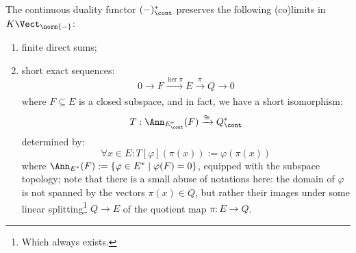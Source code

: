         \begin{proposition} \label{prop: properties_of_continuous_duals}
            The continuous duality functor $(-)^*_{\cont}$ preserves the following (co)limits in $K\-\Vect_{\norm{-}}$:
            \begin{enumerate}
                \item finite direct sums;
                \item short exact sequences:
                    $$0 \to F \xrightarrow[]{\ker \pi} E \xrightarrow[]{\pi} Q \to 0$$
                where $F \subseteq E$ is a closed subspace, and in fact, we have a short isomorphism:
                    $$T: \Ann_{E^*_{\cont}}(F) \xrightarrow[]{\cong} Q^*_{\cont}$$
                determined by:
                    $$\forall x \in E: T[\varphi]( \pi(x) ) := \varphi(\pi(x))$$
                where $\Ann_{E^*}(F) := \{ \varphi \in E^* \mid \varphi(F) = 0 \}$, equipped with the subspace topology; note that there is a small abuse of notations here: the domain of $\varphi$ is not spanned by the vectors $\pi(x) \in Q$, but rather their images under some linear splitting\footnote{Which always exists.} $Q \to E$ of the quotient map $\pi: E \to Q$.
            \end{enumerate}
        \end{proposition}
